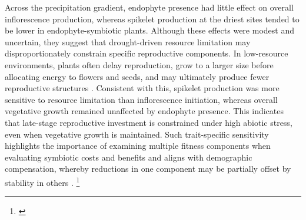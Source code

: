 \documentclass[12pt]{article}\usepackage[]{graphicx}\usepackage[dvipsnames]{xcolor}
\newcommand{\tom}[2]{{\color{red}{#1}}\footnote{\textit{\color{red}{#2}}}}
\begin{document}
Across the precipitation gradient, endophyte presence had little effect on overall inflorescence production, whereas spikelet production at the driest sites tended to be lower in endophyte-symbiotic plants. 
Although these effects were modest and uncertain, they suggest that drought-driven resource limitation may disproportionately constrain specific reproductive components. 
In low-resource environments, plants often delay reproduction, grow to a larger size before allocating energy to flowers and seeds, and may ultimately produce fewer reproductive structures \citep{wilson1989comparative}. 
Consistent with this, spikelet production was more sensitive to resource limitation than inflorescence initiation, whereas overall vegetative growth remained unaffected by endophyte presence.
This indicates that late-stage reproductive investment is constrained under high abiotic stress, even when vegetative growth is maintained. 
Such trait-specific sensitivity highlights the importance of examining multiple fitness components when evaluating symbiotic costs and benefits and aligns with demographic compensation, whereby reductions in one component may be partially offset by stability in others \citep{cheplick2009ecology}.
\tom{}{I found this paragraph challenging because I am not sure how much you are talking about direct effects of the precipitation gradient on plant investment, versus effects of the precipitation gradient on changes in the symbiosis. Different sentences mention these at different points.}
\end{document}
